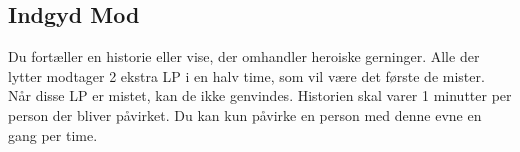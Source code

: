 \subsection*{Indgyd Mod}
Du fortæller en historie eller vise, der omhandler heroiske gerninger. Alle der lytter modtager 2 ekstra LP i en halv time, som vil være det første de mister. Når disse LP er mistet, kan de ikke genvindes. Historien skal varer 1 minutter per person der bliver påvirket. Du kan kun påvirke en person med denne evne en gang per time.